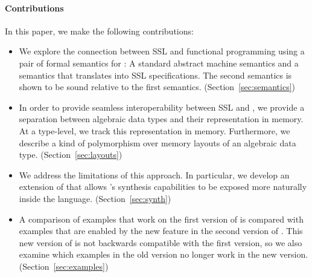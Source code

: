 \paragraph{Contributions} In this paper, we make the following contributions:
\begin{itemize}
  \item We explore the connection between SSL and functional programming using a pair of formal semantics for \Pika: A standard abstract machine semantics and a
    semantics that translates \Pika{} into SSL specifications. The second semantics is shown to be sound relative to the first semantics. (Section~\ref{sec:semantics})

  \item In order to provide seamless interoperability between SSL and \Pika, we provide a separation between algebraic data types and their representation in memory.
    At a type-level, we track this representation in memory. Furthermore, we describe a kind of polymorphism over memory layouts of an algebraic data type. (Section~\ref{sec:layouts})

  \item We address the limitations of this approach. In particular, we develop an extension of \Pika{} that allows \SuSLik's synthesis capabilities to be exposed more naturally inside the \Pika{} language. (Section~\ref{sec:synth})

  \item A comparison of examples that work on the first version of \Pika{} is compared with examples that are enabled by the new feature in the second version of \Pika. This new version of \Pika{} is not backwards compatible with the first version, so we also examine which examples in the old version no longer work in the new version. (Section~\ref{sec:examples})
\end{itemize}


